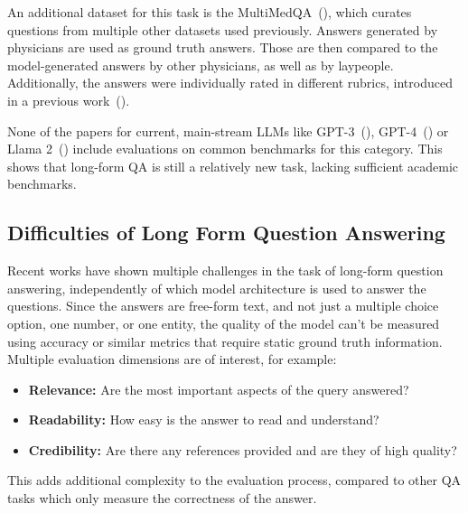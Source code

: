An additional dataset for this task is the MultiMedQA~(\cite{singhal:2023:Towards}), which curates questions from multiple other datasets used previously. 
Answers generated by physicians are used as ground truth answers.
Those are then compared to the model-generated answers by other physicians, as well as by laypeople.
Additionally, the answers were individually rated in different rubrics, introduced in a previous work~(\cite{singhal:2022:Large}).

None of the papers for current, main-stream LLMs like GPT-3~(\cite{brown:2020:Language}), GPT-4~(\cite{openai:2023:GPT}) or Llama 2~(\cite{touvron:2023:Llama}) include evaluations on common benchmarks for this category.
This shows that long-form QA is still a relatively new task, lacking sufficient academic benchmarks.

\subsection{Difficulties of Long Form Question Answering}\label{sec:long-form-qa-difficulties}
Recent works have shown multiple challenges in the task of long-form question answering, independently of which model architecture is used to answer the questions.
Since the answers are free-form text, and not just a multiple choice option, one number, or one entity, the quality of the model can't be measured using accuracy or similar metrics that require static ground truth information.
Multiple evaluation dimensions are of interest, for example:
\begin{itemize}
    \item \textbf{Relevance:} Are the most important aspects of the query answered?
    \item \textbf{Readability:} How easy is the answer to read and understand?
    \item \textbf{Credibility:} Are there any references provided and are they of high quality?
\end{itemize}
This adds additional complexity to the evaluation process, compared to other QA tasks which only measure the correctness of the answer.


